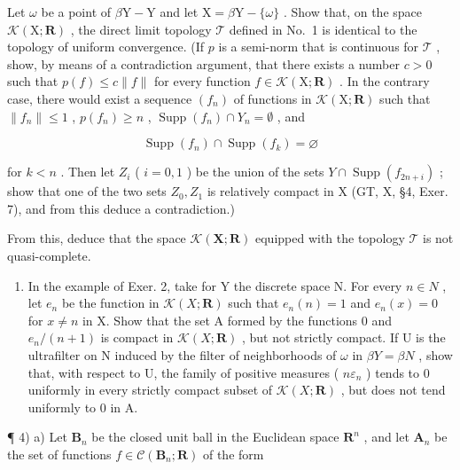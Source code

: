 Let \(\omega\) be a point of \(\beta\mathrm{Y}-\mathrm{Y}\) and let \(\mathrm{X}=\beta\mathrm{Y}-\{\omega\}\) . Show that, on the space \(\mathcal{K}(\mathrm{X};\mathbf{R})\) , the direct limit topology \(\mathcal{T}\) defined in No.~1 is identical to the topology of uniform convergence. (If \(p\) is a semi-norm that is continuous for \(\mathcal{T}\) , show, by means of a contradiction argument, that there exists a number \(c > 0\) such that \(p(f) \leqslant c \| f \|\) for every function \(f \in \mathcal{K}(\mathrm{X};\mathbf{R})\) . In the contrary case, there would exist a sequence \((f_n)\) of functions in \(\mathcal{K}(\mathrm{X};\mathbf{R})\) such that \(\| f_n \| \leqslant 1\) , \(p(f_n) \geqslant n\) , \(\operatorname{Supp}(f_n) \cap Y_n = \emptyset\) , and

\[
\operatorname{Supp} (f _ {n}) \cap \operatorname{Supp} (f _ {k}) = \varnothing
\]

for \(k < n\) . Then let \(Z_{i}\) ( \(i = 0,1\) ) be the union of the sets \(Y \cap \operatorname{Supp}(f_{2n + i})\) ; show that one of the two sets \(Z_{0}, Z_{1}\) is relatively compact in X (GT, X, §4, Exer. 7), and from this deduce a contradiction.)

From this, deduce that the space \(\mathcal{K}(\mathbf{X};\mathbf{R})\) equipped with the topology \(\mathcal{T}\) is not quasi-complete.

\begin{enumerate}
\def\labelenumi{\arabic{enumi})}
\setcounter{enumi}{2}
\tightlist
\item
  In the example of Exer. 2, take for Y the discrete space N. For every \(n \in N\) , let \(e_n\) be the function in \(\mathcal{K}(X; \mathbf{R})\) such that \(e_n(n) = 1\) and \(e_n(x) = 0\) for \(x \neq n\) in X. Show that the set A formed by the functions 0 and \(e_n/(n + 1)\) is compact in \(\mathcal{K}(X; \mathbf{R})\) , but not strictly compact. If U is the ultrafilter on N induced by the filter of neighborhoods of \(\omega\) in \(\beta Y = \beta N\) , show that, with respect to U, the family of positive measures ( \(n\varepsilon_n\) ) tends to 0 uniformly in every strictly compact subset of \(\mathcal{K}(X; \mathbf{R})\) , but does not tend uniformly to 0 in A.
\end{enumerate}

¶ 4) a) Let \(\mathbf{B}_n\) be the closed unit ball in the Euclidean space \(\mathbf{R}^n\) , and let \(\mathbf{A}_n\) be the set of functions \(f \in \mathcal{C}(\mathbf{B}_n; \mathbf{R})\) of the form

